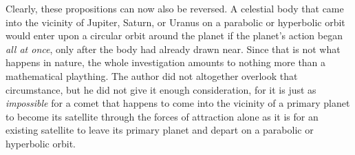 Clearly, these propositions can now also be reversed. A celestial body that came into the vicinity of Jupiter, Saturn, or Uranus on a parabolic or hyperbolic orbit would enter upon a circular orbit around the planet if the planet's action began \emph{all at once}, only after the body had already drawn near.
Since that is not what happens in nature, the whole investigation amounts to nothing more than a mathematical plaything.
The author did not altogether overlook that circumstance, but he did not give it enough consideration, for it is just as \emph{impossible} for a comet that happens to come into the vicinity of a primary planet to become its satellite through the forces of attraction alone as it is for an existing satellite to leave its primary planet and depart on a parabolic or hyperbolic orbit.
\par\clearpage\endgroup
